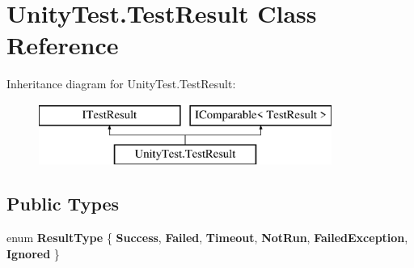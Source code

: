 \hypertarget{class_unity_test_1_1_test_result}{}\section{Unity\+Test.\+Test\+Result Class Reference}
\label{class_unity_test_1_1_test_result}
Inheritance diagram for Unity\+Test.\+Test\+Result\+:\begin{figure}[H]
\begin{center}
\leavevmode
\includegraphics[height=2.000000cm]{class_unity_test_1_1_test_result}
\end{center}
\end{figure}
\subsection*{Public Types}
\begin{DoxyCompactItemize}
\item 
\mbox{\label{class_unity_test_1_1_test_result_a6ff6280811b921441de4c57291e548be}} 
enum {\bfseries Result\+Type} \{ \newline
{\bfseries Success}, 
{\bfseries Failed}, 
{\bfseries Timeout}, 
{\bfseries Not\+Run}, 
\newline
{\bfseries Failed\+Exception}, 
{\bfseries Ignored}
 \}
\end{DoxyCompactItemize}
